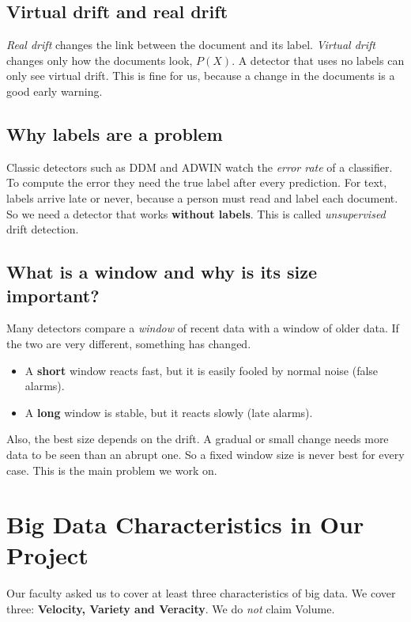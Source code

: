 \documentclass[11pt,a4paper]{article}
\begin{document}
\subsection{Virtual drift and real drift}
\emph{Real drift} changes the link between the document and its label. \emph{Virtual drift} changes only how the documents look, $P(X)$. A detector that uses no labels can only see virtual drift. This is fine for us, because a change in the documents is a good early warning.

\subsection{Why labels are a problem}
Classic detectors such as DDM and ADWIN watch the \emph{error rate} of a classifier. To compute the error they need the true label after every prediction. For text, labels arrive late or never, because a person must read and label each document. So we need a detector that works \textbf{without labels}. This is called \emph{unsupervised} drift detection.

\subsection{What is a window and why is its size important?}
Many detectors compare a \emph{window} of recent data with a window of older data. If the two are very different, something has changed.
\begin{itemize}
  \item A \textbf{short} window reacts fast, but it is easily fooled by normal noise (false alarms).
  \item A \textbf{long} window is stable, but it reacts slowly (late alarms).
\end{itemize}
Also, the best size depends on the drift. A gradual or small change needs more data to be seen than an abrupt one. So a fixed window size is never best for every case. This is the main problem we work on.

\section{Big Data Characteristics in Our Project}

Our faculty asked us to cover at least three characteristics of big data. We cover three: \textbf{Velocity, Variety and Veracity}. We do \emph{not} claim Volume.
\end{document}
